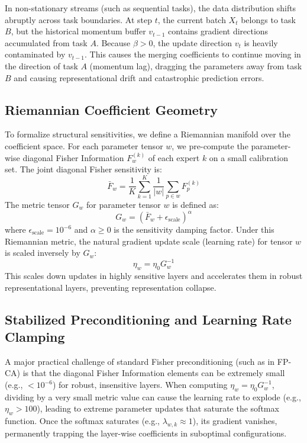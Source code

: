 \documentclass{article}
\theoremstyle{plain}
\theoremstyle{definition}
\theoremstyle{remark}
\begin{document}
In non-stationary streams (such as sequential tasks), the data distribution shifts abruptly across task boundaries. At step $t$, the current batch $X_t$ belongs to task $B$, but the historical momentum buffer $v_{t-1}$ contains gradient directions accumulated from task $A$. Because $\beta > 0$, the update direction $v_t$ is heavily contaminated by $v_{t-1}$. This causes the merging coefficients to continue moving in the direction of task $A$ (momentum lag), dragging the parameters away from task $B$ and causing representational drift and catastrophic prediction errors.

\subsection{Riemannian Coefficient Geometry}
To formalize structural sensitivities, we define a Riemannian manifold over the coefficient space. For each parameter tensor $w$, we pre-compute the parameter-wise diagonal Fisher Information $F_w^{(k)}$ of each expert $k$ on a small calibration set. The joint diagonal Fisher sensitivity is:
\begin{equation}
    \bar{F}_w = \frac{1}{K} \sum_{k=1}^K \frac{1}{|w|} \sum_{p \in w} F_p^{(k)}
\end{equation}
The metric tensor $G_w$ for parameter tensor $w$ is defined as:
\begin{equation}
    G_w = (\bar{F}_w + \epsilon_{\text{scale}})^{\alpha}
\end{equation}
where $\epsilon_{\text{scale}} = 10^{-6}$ and $\alpha \geq 0$ is the sensitivity damping factor. Under this Riemannian metric, the natural gradient update scale (learning rate) for tensor $w$ is scaled inversely by $G_w$:
\begin{equation}
    \eta_w = \eta_0 G_w^{-1}
\end{equation}
This scales down updates in highly sensitive layers and accelerates them in robust representational layers, preventing representation collapse.

\subsection{Stabilized Preconditioning and Learning Rate Clamping}
A major practical challenge of standard Fisher preconditioning (such as in FP-CA) is that the diagonal Fisher Information elements can be extremely small (e.g., $<10^{-6}$) for robust, insensitive layers. When computing $\eta_w = \eta_0 G_w^{-1}$, dividing by a very small metric value can cause the learning rate to explode (e.g., $\eta_w > 100$), leading to extreme parameter updates that saturate the softmax function. Once the softmax saturates (e.g., $\lambda_{w,k} \approx 1$), its gradient vanishes, permanently trapping the layer-wise coefficients in suboptimal configurations.
\end{document}
